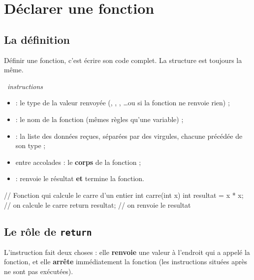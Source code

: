 \section{Déclarer une fonction}

\subsection{La définition}

Définir une fonction, c'est écrire son code complet. La structure est toujours
la même.

\begin{syntaxe}
 \code{\{}\ \textit{instructions}\ \ \code{\}}
\end{syntaxe}

\begin{itemize}
  \item {} : le type de la valeur renvoyée (, ,
        , \dots ou  si la fonction ne renvoie rien) ;
  \item {} : le nom de la fonction (mêmes règles qu'une variable) ;
  \item {} : la liste des données reçues, séparées par des virgules,
        chacune précédée de son type ;
  \item entre accolades : le \textbf{corps} de la fonction ;
  \item {} : renvoie le résultat \textbf{et} termine la fonction.
\end{itemize}

\begin{codec}
// Fonction qui calcule le carre d'un entier
int carre(int x) {
    int resultat = x * x;   // on calcule le carre
    return resultat;        // on renvoie le resultat
}
\end{codec}

\subsection{Le rôle de \texttt{return}}

\begin{definition}
L'instruction  fait deux choses : elle \textbf{renvoie} une valeur à
l'endroit qui a appelé la fonction, et elle \textbf{arrête} immédiatement la
fonction (les instructions situées après ne sont pas exécutées).
\end{definition}

